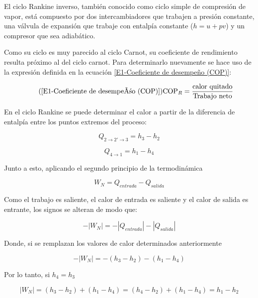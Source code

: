 	El ciclo Rankine inverso, también conocido como ciclo simple de compresión de vapor, está compuesto por dos intercambiadores que trabajen a presión constante, una válvula de expansión que trabaje con entalpía constante ($h = u + pv$) y un compresor que sea adiabático.

	Como su ciclo es muy parecido al ciclo Carnot, su coeficiente de rendimiento resulta próximo al del ciclo carnot. Para determinarlo nuevamente se hace uso de la expresión definida en la ecuación \eqref{E1-Coeficiente de desempeño (COP)}:

	\begin{equation}\tag{\ref{E1-Coeficiente de desempeño (COP)}}
		\text{COP}_R = \dfrac{\text{calor quitado}}{\text{Trabajo neto}}
	\end{equation}

	En el ciclo Rankine se puede determinar el calor a partir de la diferencia de entalpía entre los puntos extremos del proceso:

	\begin{equation}\nonumber
		Q_{2\rightarrow 2' \rightarrow 3} = h_3 - h_2
	\end{equation}

	\begin{equation}\nonumber
		Q_{4 \rightarrow 1} = h_1 - h_4
	\end{equation}

	Junto a esto, aplicando el segundo principio de la termodinámica

	\begin{equation}\nonumber
		W_N = Q_{entrada} - Q_{salida} 
	\end{equation}

	Como el trabajo es saliente, el calor de entrada es saliente y el calor de salida es entrante, los signos se alteran de modo que:

	\begin{equation}\nonumber
		-\left|W_N\right| = -\left|Q_{entrada}\right| - \left|Q_{salida}\right| 
	\end{equation}

	Donde, si se remplazan los valores de calor determinados anteriormente

	\begin{equation}\nonumber
		-\left|W_N\right| = -(h_3 - h_2) - (h_1 - h_4) 
	\end{equation}

	Por lo tanto, si $h_4 = h_3$

	\begin{equation}\nonumber
		\left|W_N\right| = (h_3 - h_2) + (h_1 - h_4) =  (h_4 - h_2) + (h_1 - h_4) = h_1 - h_2
	\end{equation}

